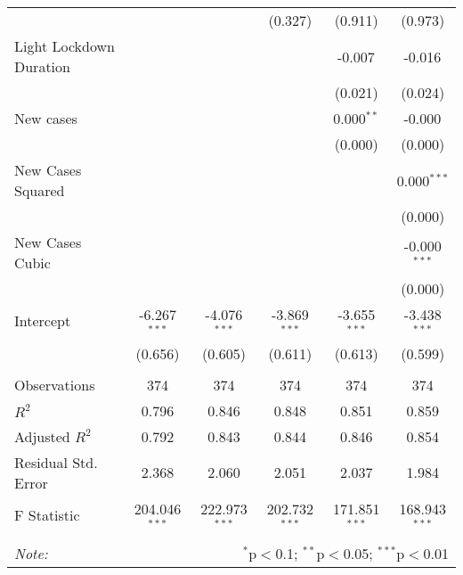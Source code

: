 \begin{tabular}{@{\extracolsep{5pt}}lccccc}
  & & & (0.327) & (0.911) & (0.973) \\
 Light Lockdown Duration & & & & -0.007$^{}$ & -0.016$^{}$ \\
  & & & & (0.021) & (0.024) \\
 New cases & & & & 0.000$^{**}$ & -0.000$^{}$ \\
  & & & & (0.000) & (0.000) \\
 New Cases Squared & & & & & 0.000$^{***}$ \\
  & & & & & (0.000) \\
 New Cases Cubic & & & & & -0.000$^{***}$ \\
  & & & & & (0.000) \\
 Intercept & -6.267$^{***}$ & -4.076$^{***}$ & -3.869$^{***}$ & -3.655$^{***}$ & -3.438$^{***}$ \\
  & (0.656) & (0.605) & (0.611) & (0.613) & (0.599) \\
\hline \\[-1.8ex]
 Observations & 374 & 374 & 374 & 374 & 374 \\
 $R^2$ & 0.796 & 0.846 & 0.848 & 0.851 & 0.859 \\
 Adjusted $R^2$ & 0.792 & 0.843 & 0.844 & 0.846 & 0.854 \\
 Residual Std. Error & 2.368 & 2.060 & 2.051 & 2.037 & 1.984  \\
 F Statistic & 204.046$^{***}$  & 222.973$^{***}$  & 202.732$^{***}$  & 171.851$^{***}$  & 168.943$^{***}$  \\
\hline
\hline \\[-1.8ex]
\textit{Note:} & \multicolumn{5}{r}{$^{*}$p$<$0.1; $^{**}$p$<$0.05; $^{***}$p$<$0.01} \\
\end{tabular}
